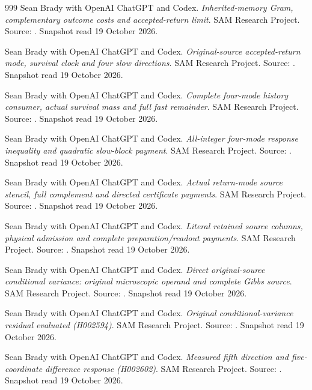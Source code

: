 \begin{thebibliography}{999}
 Sean Brady with OpenAI ChatGPT and Codex. \emph{Inherited-memory Gram, complementary outcome costs and accepted-return limit}. SAM Research Project. Source: . Snapshot read 19 October 2026.

 Sean Brady with OpenAI ChatGPT and Codex. \emph{Original-source accepted-return mode, survival clock and four slow directions}. SAM Research Project. Source: . Snapshot read 19 October 2026.

 Sean Brady with OpenAI ChatGPT and Codex. \emph{Complete four-mode history consumer, actual survival mass and full fast remainder}. SAM Research Project. Source: . Snapshot read 19 October 2026.

 Sean Brady with OpenAI ChatGPT and Codex. \emph{All-integer four-mode response inequality and quadratic slow-block payment}. SAM Research Project. Source: . Snapshot read 19 October 2026.

 Sean Brady with OpenAI ChatGPT and Codex. \emph{Actual return-mode source stencil, full complement and directed certificate payments}. SAM Research Project. Source: . Snapshot read 19 October 2026.

 Sean Brady with OpenAI ChatGPT and Codex. \emph{Literal retained source columns, physical admission and complete preparation/readout payments}. SAM Research Project. Source: . Snapshot read 19 October 2026.

 Sean Brady with OpenAI ChatGPT and Codex. \emph{Direct original-source conditional variance: original microscopic operand and complete Gibbs source}. SAM Research Project. Source: . Snapshot read 19 October 2026.

 Sean Brady with OpenAI ChatGPT and Codex. \emph{Original conditional-variance residual evaluated (H002594)}. SAM Research Project. Source: . Snapshot read 19 October 2026.

 Sean Brady with OpenAI ChatGPT and Codex. \emph{Measured fifth direction and five-coordinate difference response (H002602)}. SAM Research Project. Source: . Snapshot read 19 October 2026.


\end{thebibliography}
